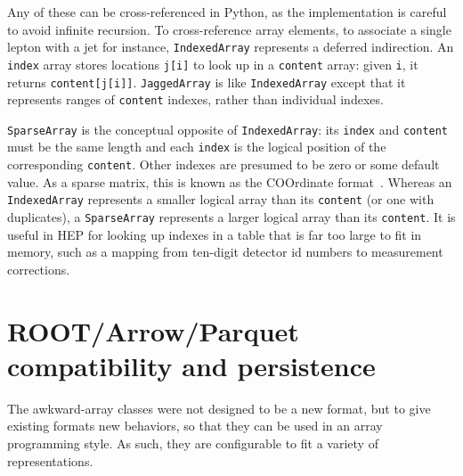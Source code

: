 \documentclass{webofc}
\begin{document}
Any of these can be cross-referenced in Python, as the implementation is careful to avoid infinite recursion. To cross-reference array elements, to associate a single lepton with a jet for instance, {\tt\small IndexedArray} represents a deferred indirection. An {\tt\small index} array stores locations {\tt\small j[i]} to look up in a {\tt\small content} array: given {\tt\small i}, it returns {\tt\small content[j[i]]}. {\tt\small JaggedArray} is like {\tt\small IndexedArray} except that it represents ranges of {\tt\small content} indexes, rather than individual indexes.

{\tt\small SparseArray} is the conceptual opposite of {\tt\small IndexedArray}: its {\tt\small index} and {\tt\small content} must be the same length and each {\tt\small index} is the logical position of the corresponding {\tt\small content}. Other indexes are presumed to be zero or some default value. As a sparse matrix, this is known as the COOrdinate format~\cite{coo}. Whereas an {\tt\small IndexedArray} represents a smaller logical array than its {\tt\small content} (or one with duplicates), a {\tt\small SparseArray} represents a larger logical array than its {\tt\small content}. It is useful in HEP for looking up indexes in a table that is far too large to fit in memory, such as a mapping from ten-digit detector id numbers to measurement corrections.

\section{ROOT/Arrow/Parquet compatibility and persistence}

The awkward-array classes were not designed to be a new format, but to give existing formats new behaviors, so that they can be used in an array programming style. As such, they are configurable to fit a variety of representations. %
\end{document}
